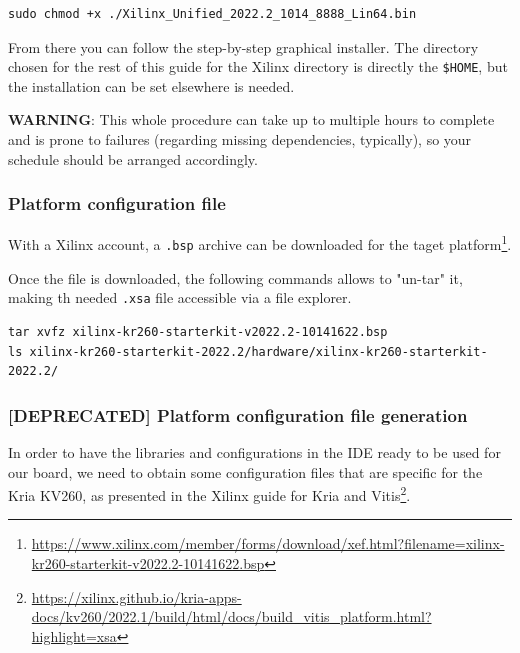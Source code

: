 \documentclass[10pt]{article}
\begin{document}
\begin{verbatim}
sudo chmod +x ./Xilinx_Unified_2022.2_1014_8888_Lin64.bin
\end{verbatim}

From there you can follow the step-by-step graphical installer.
The directory chosen for the rest of this guide for the Xilinx directory
is directly the \texttt{\$HOME}, but the installation can be set elsewhere is needed.

\begin{tcolorbox}[colback=orange!5!white,colframe=orange!75!black]
\textbf{WARNING}: This whole procedure can take up to multiple hours to complete
and is prone to failures (regarding missing dependencies, typically),
so your schedule should be arranged accordingly.
\end{tcolorbox}

\subsubsection{Platform configuration file}
\label{sec:org82ab936}
With a Xilinx account, a \texttt{.bsp} archive can be downloaded for the taget platform\footnote{\url{https://www.xilinx.com/member/forms/download/xef.html?filename=xilinx-kr260-starterkit-v2022.2-10141622.bsp}}.

Once the file is downloaded, the following commands allows to "un-tar" it,
making th needed \texttt{.xsa} file accessible via a file explorer.

\begin{verbatim}
tar xvfz xilinx-kr260-starterkit-v2022.2-10141622.bsp
ls xilinx-kr260-starterkit-2022.2/hardware/xilinx-kr260-starterkit-2022.2/
\end{verbatim}


\subsubsection{[DEPRECATED] Platform configuration file generation}
\label{sec:org100df67}
In order to have the libraries and configurations in the IDE ready to be used for our board,
we need to obtain some configuration files that are specific for the Kria KV260,
as presented in the Xilinx guide for Kria and Vitis\footnote{\url{https://xilinx.github.io/kria-apps-docs/kv260/2022.1/build/html/docs/build\_vitis\_platform.html?highlight=xsa}}.
\end{document}
